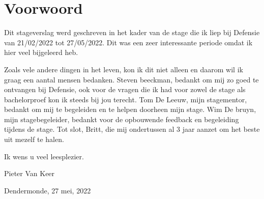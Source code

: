 \section{Voorwoord}
\label{sec:voorwoord}




Dit stageverslag werd geschreven in het kader van de stage die ik liep bij Defensie van 21/02/2022 tot 27/05/2022. Dit was een zeer interessante periode omdat ik hier veel bijgeleerd heb.

Zoals vele andere dingen in het leven, kon ik dit niet alleen en daarom wil ik graag een aantal mensen bedanken. Steven beeckman, bedankt om mij zo goed te ontvangen bij Defensie, ook voor de vragen die ik had voor zowel de stage als bachelorproef kon ik steeds bij jou terecht. Tom De Leeuw, mijn stagementor, bedankt om mij te begeleiden en te helpen doorheen mijn stage. Wim De bruyn, mijn stagebegeleider, bedankt voor de opbouwende feedback en begeleiding tijdens de stage. Tot slot, Britt, die mij ondertussen al 3 jaar aanzet om het beste uit mezelf te halen.

\begin{flushleft}
    
Ik wens u veel leesplezier.
\end{flushleft}

\begin{flushleft}

Pieter Van Keer

Dendermonde, 27 mei, 2022

\end{flushleft}
